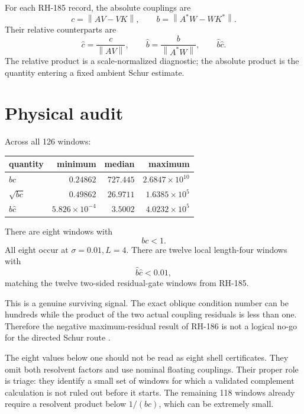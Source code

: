 \documentclass[12pt]{article}
\theoremstyle{remark}
\newcommand{\norm}[1]{\left\lVert#1\right\rVert}
\begin{document}
For each RH-185 record, the absolute couplings are
\begin{equation}\label{eq:physical-bc}
 c=\norm{AV-VK},
 \qquad
 b=\norm{A^*W-WK^*}.
\end{equation}
Their relative counterparts are
\begin{equation}\label{eq:relative-product}
 \widehat c=\frac c{\norm{AV}},
 \qquad
 \widehat b=\frac b{\norm{A^*W}},
 \qquad
 \widehat b\widehat c.
\end{equation}
The relative product is a scale-normalized diagnostic; the absolute product
is the quantity entering a fixed ambient Schur estimate.

\section{Physical audit}

Across all 126 windows:
\begin{center}
\begin{tabular}{lrrr}
\toprule
quantity & minimum & median & maximum\\
\midrule
$bc$ & $0.24862$ & $727.445$ & $2.6847\times10^{10}$\\
$\sqrt{bc}$ & $0.49862$ & $26.9711$ & $1.6385\times10^5$\\
$\widehat b\widehat c$ & $5.826\times10^{-4}$ & $3.5002$ & $4.0232\times10^5$\\
\bottomrule
\end{tabular}
\end{center}

There are eight windows with
\begin{equation}\label{eq:bc-below-one}
 bc<1.
\end{equation}
All eight occur at $\sigma=0.01,L=4$.  There are twelve local length-four
windows with
\begin{equation}\label{eq:relative-small}
 \widehat b\widehat c<0.01,
\end{equation}
matching the twelve two-sided residual-gate windows from RH-185.

This is a genuine surviving signal.  The exact oblique condition number can
be hundreds while the product of the two actual coupling residuals is less
than one.  Therefore the negative maximum-residual result of RH-186 is not a
logical no-go for the directed Schur route \citep{WangRH186}.

The eight values below one should not be read as eight shell certificates.
They omit both resolvent factors and use nominal floating couplings.  Their
proper role is triage: they identify a small set of windows for which a
validated complement calculation is not ruled out before it starts.  The
remaining 118 windows already require a resolvent product below $1/(bc)$,
which can be extremely small.
\end{document}
